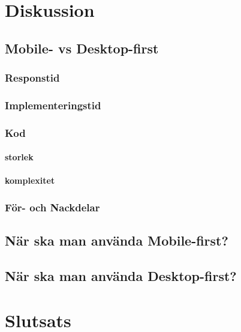 \documentclass[11pt]{article}
\begin{document}
\section{Diskussion}
\subsection{Mobile- vs Desktop-first}
\subsubsection{Responstid}
\subsubsection{Implementeringstid}
\subsubsection{Kod}
\paragraph{storlek}
\paragraph{komplexitet}
\subsubsection{För- och Nackdelar}
\subsection{När ska man använda Mobile-first?}
\subsection{När ska man använda Desktop-first?}
\section{Slutsats}





\printbibliography
\end{document}
